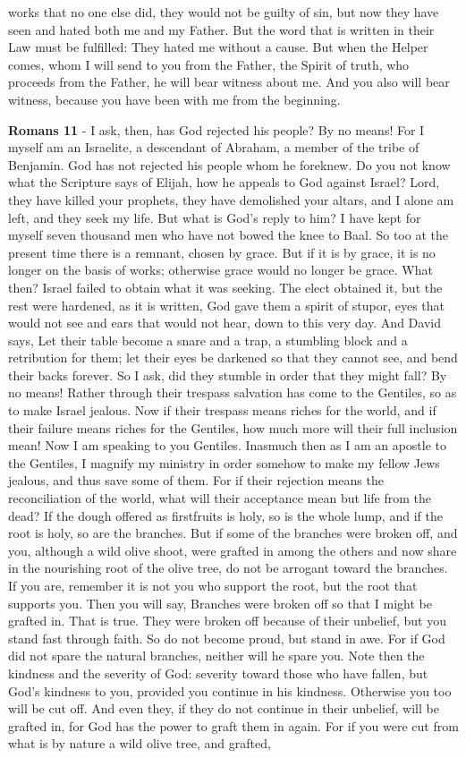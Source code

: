 \documentclass[11pt]{article}
\begin{document}
works that no one else did, they would not be guilty of sin, but now they have seen and hated both me and my Father. But the word that is written in their Law must be fulfilled: They hated me without a cause. But when the Helper comes, whom I will send to you from the Father, the Spirit of truth, who proceeds from the Father, he will bear witness about me. And you also will bear witness, because you have been with me from the beginning.

\textbf{Romans 11} - I ask, then, has God rejected his people? By no means! For I myself am an Israelite, a descendant of Abraham, a member of the tribe of Benjamin. God has not rejected his people whom he foreknew. Do you not know what the Scripture says of Elijah, how he appeals to God against Israel? Lord, they have killed your prophets, they have demolished your altars, and I alone am left, and they seek my life. But what is God's reply to him? I have kept for myself seven thousand men who have not bowed the knee to Baal. So too at the present time there is a remnant, chosen by grace. But if it is by grace, it is no longer on the basis of works; otherwise grace would no longer be grace. What then? Israel failed to obtain what it was seeking. The elect obtained it, but the rest were hardened, as it is written, God gave them a spirit of stupor, eyes that would not see and ears that would not hear, down to this very day. And David says, Let their table become a snare and a trap, a stumbling block and a retribution for them; let their eyes be darkened so that they cannot see, and bend their backs forever. So I ask, did they stumble in order that they might fall? By no means! Rather through their trespass salvation has come to the Gentiles, so as to make Israel jealous. Now if their trespass means riches for the world, and if their failure means riches for the Gentiles, how much more will their full inclusion mean! Now I am speaking to you Gentiles. Inasmuch then as I am an apostle to the Gentiles, I magnify my ministry in order somehow to make my fellow Jews jealous, and thus save some of them. For if their rejection means the reconciliation of the world, what will their acceptance mean but life from the dead? If the dough offered as firstfruits is holy, so is the whole lump, and if the root is holy, so are the branches. But if some of the branches were broken off, and you, although a wild olive shoot, were grafted in among the others and now share in the nourishing root of the olive tree, do not be arrogant toward the branches. If you are, remember it is not you who support the root, but the root that supports you. Then you will say, Branches were broken off so that I might be grafted in. That is true. They were broken off because of their unbelief, but you stand fast through faith. So do not become proud, but stand in awe. For if God did not spare the natural branches, neither will he spare you. Note then the kindness and the severity of God: severity toward those who have fallen, but God's kindness to you, provided you continue in his kindness. Otherwise you too will be cut off. And even they, if they do not continue in their unbelief, will be grafted in, for God has the power to graft them in again. For if you were cut from what is by nature a wild olive tree, and grafted, 
\end{document}
